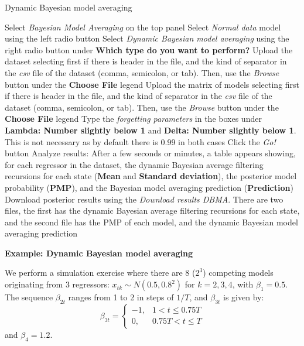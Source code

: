 \begin{algorithm}[h!]
	\caption{Dynamic Bayesian model averaging}\label{alg:DBMA}
	\begin{algorithmic}[1]  		 			
		\State Select \textit{Bayesian Model Averaging} on the top panel
		\State Select \textit{Normal data} model using the left radio button
		\State Select \textit{Dynamic Bayesian model averaging} using the right radio button under \textbf{Which type do you want to perform?}
		\State Upload the dataset selecting first if there is header in the file, and the kind of separator in the \textit{csv} file of the dataset (comma, semicolon, or tab). Then, use the \textit{Browse} button under the \textbf{Choose File} legend
		\State Upload the matrix of models selecting first if there is header in the file, and the kind of separator in the \textit{csv} file of the dataset (comma, semicolon, or tab). Then, use the \textit{Browse} button under the \textbf{Choose File} legend
		\State Type the \textit{forgetting parameters} in the boxes under \textbf{Lambda: Number slightly below 1} and \textbf{Delta: Number slightly below 1}. This is not necessary as by default there is 0.99 in both cases  
		\State Click the \textit{Go!} button
		\State Analyze results: After a few seconds or minutes, a table appears showing, for each regressor in the dataset, the dynamic Bayesian average filtering recursions for each state (\textbf{Mean} and \textbf{Standard deviation}), the posterior model probability (\textbf{PMP}), and the Bayesian model averaging prediction (\textbf{Prediction})
		\State Download posterior results using the \textit{Download results DBMA}. There are two files, the first has the dynamic Bayesian average filtering recursions for each state, and the second file has the PMP of each model, and the dynamic Bayesian model averaging prediction
	\end{algorithmic} 
\end{algorithm}

\textbf{Example: Dynamic Bayesian model averaging}

We perform a simulation exercise where there are 8 ($2^3$) competing models originating from 3 regressors: $x_{tk} \sim N(0.5, 0.8^2)$ for $k = 2, 3, 4$, with $\beta_1 = 0.5$. The sequence $\beta_{2t}$ ranges from 1 to 2 in steps of $1/T$, and $\beta_{3t}$ is given by:
\[
\beta_{3t} = \begin{cases}
	-1, & 1 < t \leq 0.75T \\
	0, & 0.75T < t \leq T
\end{cases}
\]
and $\beta_4 = 1.2$. 

